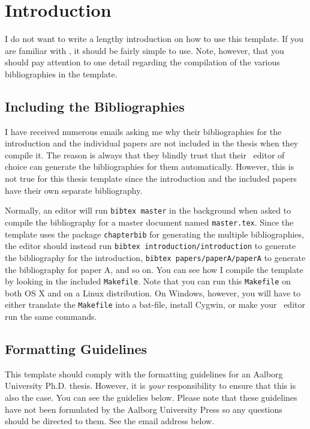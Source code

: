 \section{Introduction}\label{sec:introduction}
I do not want to write a lengthy introduction on how to use this template. If you are familiar with \LaTeXe, it should be fairly simple to use. Note, however, that you should pay attention to one detail regarding the compilation of the various bibliographies in the template.

\subsection{Including the Bibliographies}
I have received numerous emails asking me why their bibliographies for the introduction and the individual papers are not included in the thesis when they compile it. The reason is always that they blindly trust that their \LaTeXe\ editor of choice can generate the bibliographies for them automatically. However, this is not true for this thesis template since the introduction and the included papers have their own separate bibliography.

Normally, an editor will run {\tt bibtex master} in the background when asked to compile the bibliography for a master document named {\tt master.tex}. Since the template uses the package {\tt chapterbib} for generating the multiple bibliographies, the editor should instead run {\tt bibtex introduction/introduction} to generate the bibliography for the introduction, {\tt bibtex papers/paperA/paperA} to generate the bibliography for paper A, and so on. You can see how I compile the template by looking in the included {\tt Makefile}. Note that you can run this {\tt Makefile} on both OS X and on a Linux distribution. On Windows, however, you will have to either translate the {\tt Makefile} into a bat-file, install Cygwin, or make your \LaTeXe\ editor run the same commands.

\subsection{Formatting Guidelines}
This template should comply with the formatting guidelines for an Aalborg University Ph.D. thesis. However, it is \textit{your} responsibility to ensure that this is also the case. You can see the guidelies below. Please note that these guidelines have not been formulated by the Aalborg University Press so any questions should be directed to them. See the email address below.


